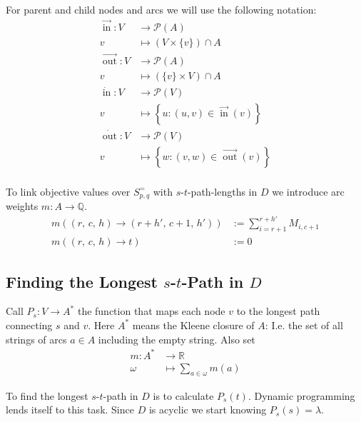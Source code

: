\documentclass{amsart}
\theoremstyle{definition}
\DeclareMathOperator{\In}{in}
\DeclareMathOperator{\Out}{out}
\newcommand{\ina}{\ensuremath{\vec{\In}}}
\newcommand{\outa}{\ensuremath{\vec{\Out}}}
\newcommand{\inv}{\ensuremath{\dot{\In}}}
\newcommand{\outv}{\ensuremath{\dot{\Out}}}
\begin{document}
For parent and child nodes and arcs we will use the following notation:
\begin{align*}
\ina\colon  V &\to \mathcal{P}(A) \\
v &\mapsto \left(V \times \{v\}\right) \cap A\\
\outa\colon  V &\to \mathcal{P}(A) \\
v &\mapsto \left(\{v\} \times V\right) \cap A\\
\inv\colon  V &\to \mathcal{P}(V) \\
v &\mapsto \left\{ u \colon \left(u,v\right) \in \ina(v) \right\}\\
\outv\colon  V &\to \mathcal{P}(V) \\
v &\mapsto \left\{w \colon \left(v,w\right) \in \outa\left(v\right) \right\}\\
\end{align*}

To link objective values over \(S^=_{p,q}\) with
\(s\)-\(t\)-path-lengths in \(D\) we introduce arc weights \(m\colon A \to \mathbb{Q}\).
\begin{align}
\label{objLink}
  m\left(\left(r,\, c,\, h\right) \rightarrow \left(r+h',\, c+1,\, h'\right) \right) & := \sum_{i=r+1}^{r+h'} M_{i,c+1} \\
  m\left(\left(r,\, c,\, h\right) \rightarrow t \right) & := 0
\end{align}

\subsection{Finding the Longest \(s\)-\(t\)-Path in \(D\)}

Call \(P_s \colon V \to A^* \) the function that maps each node \(v\)
to the longest path connecting \(s\) and \(v\).  Here \(A^*\) means
the Kleene closure of \(A\): I.e. the set of all strings of arcs \(a
\in A\) including the empty string.  Also set 
\begin{align*}
m \colon A^* &\to \mathbb{R} \\
\omega &\mapsto \sum_{a\in \omega} m \left(a \right)
\end{align*}

To find the longest \(s\)-\(t\)-path in \(D\) is to calculate
\(P_s (t)\).  Dynamic programming lends itself to this task.  Since
\(D\) is acyclic we start knowing \(P_s (s) = \lambda\).
\end{document}
